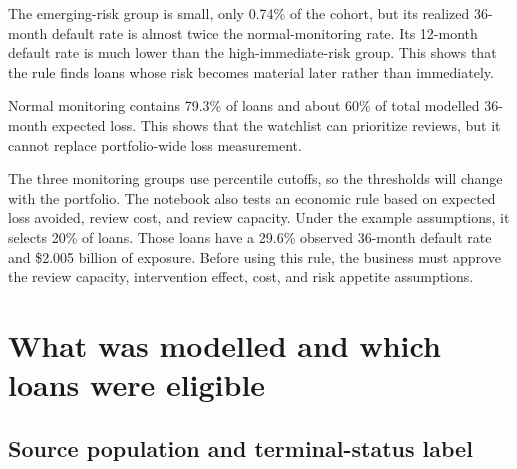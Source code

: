 \documentclass[11pt]{article}
\begin{document}
\begin{table}[H]
\centering
\caption{Watchlist profile in the common 2015 horizon cohort. Expected loss uses
adjusted 36-month PD, a constant 60\% LGD, and original loan amount as EAD.}
\label{tab:watchlist}
\end{table}

The emerging-risk group is small, only 0.74\% of the cohort, but its realized
36-month default rate is almost twice the normal-monitoring rate. Its 12-month
default rate is much lower than the high-immediate-risk group. This shows that the
rule finds loans whose risk becomes material later rather than immediately.

Normal monitoring contains 79.3\% of loans and about 60\% of total modelled
36-month expected loss. This shows that the watchlist can prioritize reviews, but
it cannot replace portfolio-wide loss measurement.

The three monitoring groups use percentile cutoffs, so the thresholds will change
with the portfolio. The notebook also tests an economic rule based on expected
loss avoided, review cost, and review capacity. Under the example assumptions, it
selects 20\% of loans. Those loans have a 29.6\% observed 36-month default rate and
\$2.005 billion of exposure. Before using this rule, the business must approve the
review capacity, intervention effect, cost, and risk appetite assumptions.

\section{What was modelled and which loans were eligible}

\subsection{Source population and terminal-status label}
\end{document}
